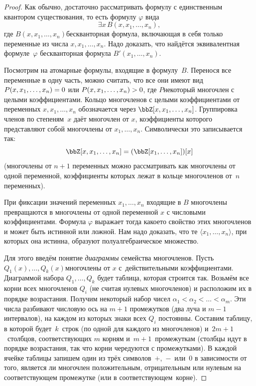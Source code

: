 \begin{proof}
Как обычно, достаточно рассматривать формулу с единственным квантором
существования, то есть формулу $\varphi$ вида
        $$
\exists x\, B(x,x_1,\dots,x_n),
        $$
где $B(x,x_1,\dots,x_n)$\т бескванторная формула, включающая в
себя только переменные из числа $x,x_1,\dots,x_n$. Надо
доказать, что найдётся эквивалентная формуле~$\varphi$
бескванторная формула
$B'(x_1,\dots,x_n)$.

Посмотрим на атомарные формулы, входящие в формулу~$B$. Перенося все
переменные в одну часть, можно считать, что все они имеют вид $P(x,x_1,\dots,x_n)\hm=0$ или
$P(x,x_1,\dots,x_n)\hm>0$, где $P$\т некоторый многочлен с
целыми коэффициентами. Кольцо
многочленов с целыми коэффициентами от переменных
$x,x_1,\dots,x_n$ обозначается через $\bbZ[x,x_1,\dots,x_n]$.
Группировка членов по степеням~$x$ даёт многочлен от
$x$, коэффициенты которого представляют собой многочлены от
$x_1,\dots,x_n$. Символически это записывается так:
        $$
\bbZ[x,x_1,\dots,x_n]=(\bbZ[x_1,\dots,x_n])[x]
        $$
(многочлены от $n+1$ переменных можно рассматривать как
многочлены от одной переменной, коэффициенты которых лежат в
кольце многочленов от~$n$ переменных).

При фиксации значений переменных $x_1,\dots,x_n$ входящие в $B$
многочлены превращаются в многочлены от одной переменной $x$ с
числовыми коэффициентами. Формула $\varphi$ выражает тогда
какое\д то свойство этих многочленов и может быть истинной или
ложной. Нам надо доказать, что те $\langle
x_1,\dots,x_n\rangle$, при которых она истинна, образуют
полуалгебраическое множество.

Для этого введём понятие \emph{диаграммы}%
семейства многочленов.
Пусть $Q_1(x),\dots,Q_k(x)$\т многочлены от $x$ с~действительными
коэффициентами. Диаграммой набора
$Q_1,\dots,Q_k$ будет таблица, которая строится так. Возьмём все
корни всех многочленов $Q_i$ (не считая нулевых многочленов) и
расположим их в порядке возрастания. Получим некоторый набор
чисел $\alpha_1<\alpha_2<\ldots<\alpha_m$. Эти числа разбивают
числовую ось на $m+1$ промежутков (два луча и $m-1$ интервалов),
на каждом из которых знаки всех $Q_i$ постоянны. Составим
таблицу, в которой будет~$k$~строк (по одной для каждого из
многочленов) и~$2m+1$~столбцов, соответствующих $m$ корням
и~$m+1$~промежуткам (столбцы идут в порядке возрастания, так что
корни чередуются с промежутками). В каждой ячейке таблицы
запишем один из трёх символов~$+$,~$-$~или~$0$ в зависимости от
того, является ли многочлен положительным, отрицательным или
нулевым на соответствующем промежутке (или в
соответствующем~корне).


\end{proof}
